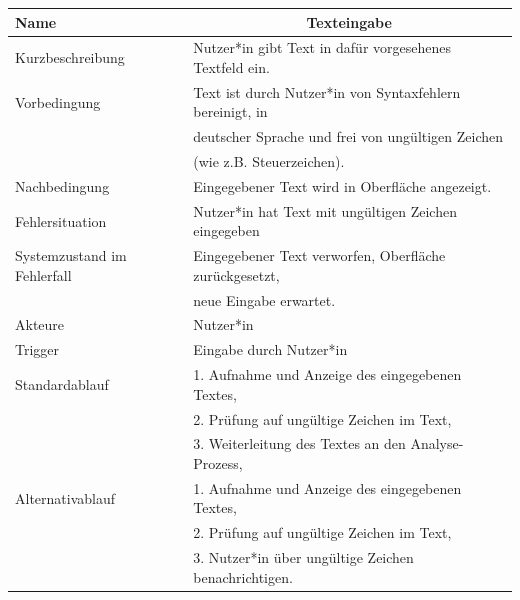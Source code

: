 \documentclass[paper=a4, parskip=half]{scrreprt}
\begin{document}
\begin{table}[htbp]
\begin{tabular}{|l|l|}
\hline
Name                        & \multicolumn{1}{c|}{\textbf{Texteingabe}} \\ \hline
Kurzbeschreibung            & Nutzer*in gibt Text in dafür vorgesehenes Textfeld ein. \\ \hline
Vorbedingung                & Text ist durch Nutzer*in von Syntaxfehlern bereinigt, in \\
                            & deutscher Sprache und frei von ungültigen Zeichen \\
                            & (wie z.B. Steuerzeichen). \\ \hline
Nachbedingung               & Eingegebener Text wird in Oberfläche angezeigt. \\ \hline
Fehlersituation             & Nutzer*in hat Text mit ungültigen Zeichen eingegeben \\ \hline
Systemzustand im Fehlerfall & Eingegebener Text verworfen, Oberfläche zurückgesetzt, \\
                            & neue Eingabe erwartet. \\ \hline
Akteure                     & Nutzer*in \\ \hline
Trigger                     & Eingabe durch Nutzer*in \\ \hline
Standardablauf              & 1. Aufnahme und Anzeige des eingegebenen Textes, \\
                            & 2. Prüfung auf ungültige Zeichen im Text, \\
                            & 3. Weiterleitung des Textes an den Analyse-Prozess, \\ \hline
Alternativablauf            & 1. Aufnahme und Anzeige des eingegebenen Textes, \\
                            & 2. Prüfung auf ungültige Zeichen im Text, \\
                            & 3. Nutzer*in über ungültige Zeichen benachrichtigen. \\ \hline
\end{tabular}
\end{table}
\end{document}
